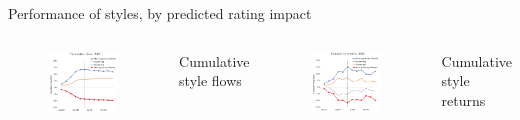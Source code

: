\documentclass[UTF8, 16pt]{beamer}
\begin{document}
\begin{CJK*}{UTF8}{gbsn}
\begin{frame}{Performance of styles, by predicted rating impact}
\begin{columns}
\begin{figure}[htpb]
\begin{center}
		    \includegraphics[width=1  \linewidth]
		    {pic/event_flows.png}
		  \end{center}
		\end{figure}
		\vspace{-0.6cm}
		\center\tiny{Cumulative style flows}
		\begin{figure}[htpb]
		  \begin{center}
		    \includegraphics[width=1  \linewidth]
		    {pic/event_returns.png}
		  \end{center}
		\end{figure}
		\vspace{-0.6cm}
		\center\tiny{Cumulative style returns}
	\end{columns}
\end{frame}


\end{CJK*}
\end{document}
